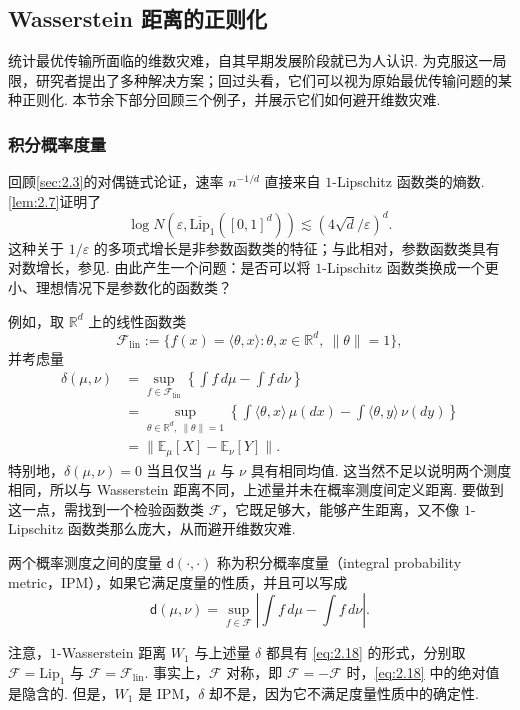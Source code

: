 \subsection{Wasserstein 距离的正则化}\label{sec:2.8}
统计最优传输所面临的维数灾难，自其早期发展阶段就已为人认识. 为克服这一局限，研究者提出了多种解决方案；回过头看，它们可以视为原始最优传输问题的某种正则化. 本节余下部分回顾三个例子，并展示它们如何避开维数灾难.

\subsubsection{积分概率度量}\label{sec:2.8.1}
回顾\autoref{sec:2.3}的对偶链式论证，速率 $n^{-1/d}$ 直接来自 $1$-Lipschitz 函数类的熵数. \autoref{lem:2.7}证明了
$$\log N(\varepsilon,\overline{\mathrm{Lip}}_1([0,1]^d))\lesssim(4\sqrt d/\varepsilon)^d.$$
这种关于 $1/\varepsilon$ 的多项式增长是非参数函数类的特征；与此相对，参数函数类具有对数增长，参见\cite{ref149}. 由此产生一个问题：是否可以将 $1$-Lipschitz 函数类换成一个更小、理想情况下是参数化的函数类？

例如，取 $\mathbb R^d$ 上的线性函数类
$$\mathcal F_{\mathrm{lin}}:=\{f(x)=\langle\theta,x\rangle:\theta,x\in\mathbb R^d,\ \lVert\theta\rVert=1\},$$
并考虑量
$$\begin{aligned}
\delta(\mu,\nu)&=\sup_{f\in\mathcal F_{\mathrm{lin}}}\left\{\int f\,d\mu-\int f\,d\nu\right\}\\
&=\sup_{\theta\in\mathbb R^d,\ \lVert\theta\rVert=1}\left\{\int\langle\theta,x\rangle\,\mu(dx)-\int\langle\theta,y\rangle\,\nu(dy)\right\}\\
&=\lVert\mathbb E_\mu[X]-\mathbb E_\nu[Y]\rVert.
\end{aligned}$$
特别地，$\delta(\mu,\nu)=0$ 当且仅当 $\mu$ 与 $\nu$ 具有相同均值. 这当然不足以说明两个测度相同，所以与 Wasserstein 距离不同，上述量并未在概率测度间定义距离. 要做到这一点，需找到一个检验函数类 $\mathcal F$，它既足够大，能够产生距离，又不像 $1$-Lipschitz 函数类那么庞大，从而避开维数灾难.
\begin{definition}\label{def:2.19}
两个概率测度之间的度量 $\mathsf d(\cdot,\cdot)$ 称为积分概率度量（integral probability metric，IPM），如果它满足度量的性质，并且可以写成
\begin{equation}\label{eq:2.18}
\mathsf d(\mu,\nu)=\sup_{f\in\mathcal F}\left|\int f\,d\mu-\int f\,d\nu\right|.
\end{equation}
\end{definition}
注意，$1$-Wasserstein 距离 $W_1$ 与上述量 $\delta$ 都具有 \eqref{eq:2.18} 的形式，分别取 $\mathcal F=\mathrm{Lip}_1$ 与 $\mathcal F=\mathcal F_{\mathrm{lin}}$. 事实上，$\mathcal F$ 对称，即 $\mathcal F=-\mathcal F$ 时，\eqref{eq:2.18} 中的绝对值是隐含的. 但是，$W_1$ 是 IPM，$\delta$ 却不是，因为它不满足度量性质中的确定性.

